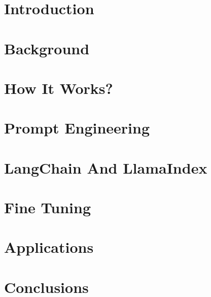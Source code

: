 \section[Intro]{Introduction}


\section[Back]{Background}


\section[How]{How It Works?}


\section[Prompts]{Prompt Engineering}


\section[LL]{LangChain And LlamaIndex}



\section[Consult]{Fine Tuning}




\section[Apps]{Applications}



\section[Concl]{Conclusions}


